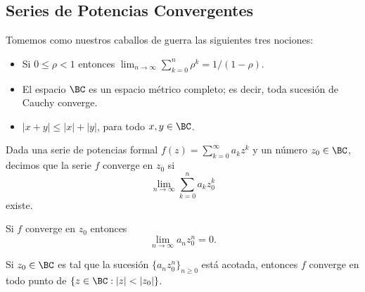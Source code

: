 \subsection{Series de Potencias Convergentes}

Tomemos como nuestros caballos de guerra las siguientes tres nociones:
\begin{itemize}
  \item Si $0 \leq \rho < 1$ entonces $\lim_{n \to \infty} \sum_{k = 0}^n \rho^k = 1 / (1 - \rho)$.
  \item El espacio $\BC$ es un espacio m\'etrico completo; es decir, toda sucesi\'on de Cauchy converge.
  \item $|x + y| \leq |x| + |y|$, para todo $x, y \in \BC$.
\end{itemize}

Dada una serie de potencias formal $f(z) = \sum_{k = 0}^{\infty} a_k z^k$ y un n\'umero $z_0 \in \BC$,
decimos que la serie $f$ converge en $z_0$ si
\[
  \lim_{n \to \infty} \sum_{k = 0}^n a_k z_0^k
\]
existe.

\begin{theorem}
  Si $f$ converge en $z_0$ entonces
  \[
    \lim_{n \to \infty} a_n z_0^n = 0.  
  \]
\end{theorem}

\begin{theorem}
  Si $z_0 \in \BC$ es tal que la sucesi\'on $\{a_n z_0^n\}_{n \geq 0}$ est\'a acotada, entonces
  $f$ converge en todo punto de $\{z \in \BC : |z| < |z_0|\}$.
\end{theorem}

\begin{theorem}

\end{theorem}